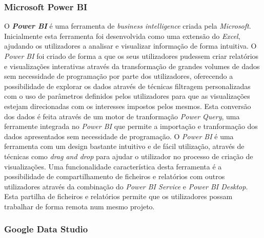\subsubsection{Microsoft Power BI} %
\label{ssub:microsoft}

O \textbf{\textit{Power BI}} \cite{powerBI} é uma ferramenta de \textit{business intelligence} criada pela \textit{Microsoft}. Inicialmente esta ferramenta foi desenvolvida como uma extensão do \textit{Excel}, ajudando os utilizadores a analisar e visualizar informação de forma intuitiva. O \textit{Power BI} foi criado de forma a que os seus utilizadores pudessem criar relatórios e visualizações interativas através da transformação de grandes volumes de dados sem necessidade de programação por parte dos utilizadores, oferecendo a possibilidade de explorar os dados através de técnicas filtragem personalizadas com o uso de parâmetros definidos pelos utilizadores para que as visualizações estejam direcionadas com os interesses impostos pelos mesmos. Esta conversão dos dados é feita através de um motor de tranformação \textit{Power Query}, uma ferramente integrada no \textit{Power BI} que permite a importação e tranformação dos dados apresentados sem necessidade de programação. O \textit{Power BI} é uma ferramenta com um design bastante intuitivo e de fácil utilização, através de técnicas como \textit{drag and drop} para ajudar o utilizador no processo de criação de visualizações. Uma funcionalidade característica desta ferramenta é a possibilidade de compartilhamento de ficheiros e relatórios com outros utilizadores através da combinação do \textit{Power BI Service} e \textit{Power BI Desktop}. Esta partilha de ficheiros e relatórios permite que os utilizadores possam trabalhar de forma remota num mesmo projeto. %

\subsubsection{Google Data Studio} %
\label{ssub:google}

